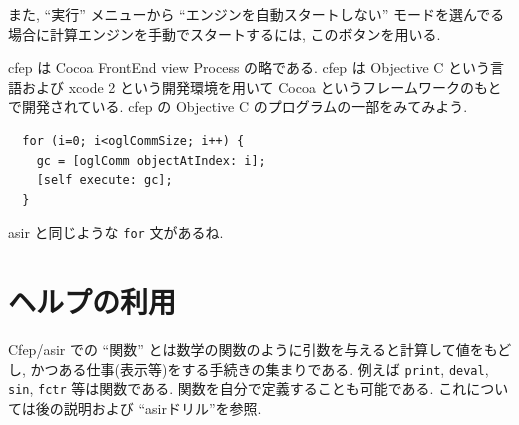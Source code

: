 \documentclass{jbook}
\begin{document}
また, ``実行'' メニューから ``エンジンを自動スタートしない'' モードを選んでる
場合に計算エンジンを手動でスタートするには, このボタンを用いる.

\bigbreak

\noindent
\HHH
cfep は  
Cocoa FrontEnd view Process 
の略である.
cfep は Objective C という言語および xcode 2 という開発環境を用いて
Cocoa というフレームワークのもとで開発されている.
cfep の Objective C のプログラムの一部をみてみよう.
\begin{screen}
\begin{verbatim}
  for (i=0; i<oglCommSize; i++) {
    gc = [oglComm objectAtIndex: i];
    [self execute: gc];
  }
\end{verbatim}
\end{screen}
asir と同じような {\tt for} 文があるね.

\section{ヘルプの利用}

Cfep/asir での ``関数'' とは数学の関数のように引数を与えると計算して値をもどし,
かつある仕事(表示等)をする手続きの集まりである.
例えば {\tt print}, {\tt deval}, {\tt sin}, {\tt fctr} 等は関数である.
関数を自分で定義することも可能である. これについては後の説明および
``asirドリル''を参照.
\end{document}
